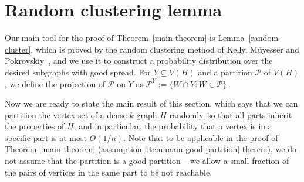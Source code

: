 \documentclass[11pt, letterpaper]{amsart}
\theoremstyle{plain}
\numberwithin{equation}{section}
\theoremstyle{definition}
\begin{document}
\section{Random clustering lemma}\label{random clustering lemma}

Our main tool for the proof of Theorem~\ref{main theorem} is Lemma~\ref{random cluster}, which is proved by the random clustering method of Kelly, M\"{u}yesser and Pokrovskiy~\cite{kelly2024optimal}, and we use it to construct a probability distribution over the desired subgraphs with good spread. For $Y\subseteq V(H)$ and a partition $\mathcal{P}$ of $V(H)$, we define the projection of $\mathcal{P}$ on $Y$ as  $\mathcal{P}^Y:=\{W\cap Y:W\in \mathcal{P}\}$.
    
Now we are ready to state the main result of this section, which says that we can partition the vertex set of a dense $k$-graph $H$ randomly, so that all parts inherit the properties of $H$, and in particular, the probability that a vertex is in a specific part is at most $O(1/n)$.
Note that to be applicable in the proof of Theorem~\ref{main theorem} (assumption \ref{item:main-good partition} therein), we do not assume that the partition is a good partition -- we allow a small fraction of the pairs of vertices in the same part to be not reachable.
\end{document}
